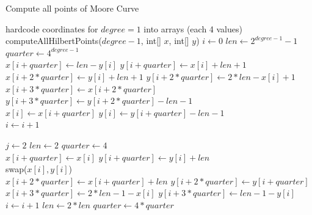 \documentclass[course=erap]{aspdoc}
\begin{document}
\begin{algorithm}[H]
\begin{algorithmic}
\caption{Compute all points of Moore Curve}
\label{moore:batch}
\State hardcode coordinates for $degree =1$ into arrays (each 4 values)
	\Return
\EndIf	
\State computeAllHilbertPoints($degree - 1$, int[] $x$, int[] $y$)
\State $i \leftarrow 0$
\State $len \leftarrow 2^{degree - 1} -1$ 
\State $quarter \leftarrow 4^{degree-1}$
\\ 
\State $x[i + quarter] \leftarrow len - y[i]$
\State $y[i + quarter] \leftarrow x[i] + len + 1$
\\ 
\State $x[i + 2*quarter] \leftarrow y[i] + len + 1$
\State $y[i + 2*quarter] \leftarrow 2 * len - x[i] + 1$
\\ 
\State $x[i + 3*quarter] \leftarrow x[i + 2*quarter]$
\State $y[i + 3*quarter] \leftarrow y[i + 2*quarter] - len - 1$
\\ 
\State $x[i] \leftarrow x[i + quarter]$
\State $y[i] \leftarrow y[i + quarter] - len - 1$
\\
\State $i \leftarrow i+1$
\EndWhile
\EndFunction



\State $j \leftarrow 2$
\State $len \leftarrow 2$ 
\State $quarter \leftarrow 4$
\\ 
\State $x[i + quarter] \leftarrow x[i]$
\State $y[i + quarter] \leftarrow y[i] + len$
\\ 
\State swap($x[i], y[i]$)
\\ 
\State $x[i + 2*quarter] \leftarrow x[i + quarter] + len$
\State $y[i + 2*quarter] \leftarrow y[i + quarter]$
\\ 
\State $x[i + 3*quarter] \leftarrow 2*len - 1 - x[i]$
\State $y[i + 3*quarter] \leftarrow len - 1 - y[i]$
\EndWhile
\State $i \leftarrow i+1$
\State $len \leftarrow 2*len$
\State $quarter \leftarrow 4*quarter$
\EndWhile
\EndFunction
\end{algorithmic}
\end{algorithm}
\end{document}
